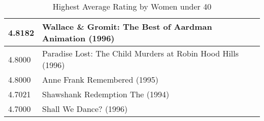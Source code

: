 \begin{flushleft}
\begin{table}[h]
\begin{tabular}{ll}
4.8182 & Wallace \& Gromit: The Best of Aardman Animation (1996)                         \\ \hline
4.8000 & Paradise Lost: The Child Murders at Robin Hood Hills (1996)                     \\ \hline
4.8000 & Anne Frank Remembered (1995)                                                    \\
4.7021 & Shawshank Redemption The (1994)                                                 \\ \hline
4.7000 & Shall We Dance? (1996)                                                          \\

\end{tabular}
\caption{Highest Average Rating by Women under 40}
\end{table}

\end{flushleft}




